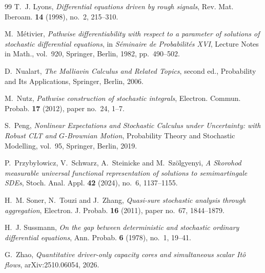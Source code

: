 \documentclass[11pt,reqno]{amsart}
\theoremstyle{plain}
\theoremstyle{definition}
\begin{document}
{\begin{thebibliography}{99}
T.~J. Lyons,
\emph{Differential equations driven by rough signals},
Rev. Mat. Iberoam. \textbf{14} (1998), no.~2, 215--310.

M.~M\'etivier,
\emph{Pathwise differentiability with respect to a parameter of solutions of
stochastic differential equations},
in \emph{S\'eminaire de Probabilit\'es XVI}, Lecture Notes in Math.,
vol.~920, Springer, Berlin, 1982, pp.~490--502.

D.~Nualart,
\emph{The Malliavin Calculus and Related Topics}, second ed.,
Probability and Its Applications, Springer, Berlin, 2006.

M.~Nutz,
\emph{Pathwise construction of stochastic integrals},
Electron. Commun. Probab. \textbf{17} (2012), paper no.~24, 1--7.

S.~Peng,
\emph{Nonlinear Expectations and Stochastic Calculus under Uncertainty:
with Robust CLT and \(G\)-Brownian Motion},
Probability Theory and Stochastic Modelling, vol.~95,
Springer, Berlin, 2019.

P.~Przyby{\l}owicz, V.~Schwarz, A.~Steinicke and M.~Sz{\"o}lgyenyi,
\emph{A Skorohod measurable universal functional representation of
solutions to semimartingale SDEs},
Stoch. Anal. Appl. \textbf{42} (2024), no.~6, 1137--1155.

H.~M. Soner, N.~Touzi and J.~Zhang,
\emph{Quasi-sure stochastic analysis through aggregation},
Electron. J. Probab. \textbf{16} (2011), paper no.~67, 1844--1879.

H.~J. Sussmann,
\emph{On the gap between deterministic and stochastic ordinary differential
equations},
Ann. Probab. \textbf{6} (1978), no.~1, 19--41.

G.~Zhao,
\emph{Quantitative driver-only capacity cores and simultaneous scalar It\^o
flows},
arXiv:2510.06054, 2026.

\end{thebibliography}
}
\end{document}

